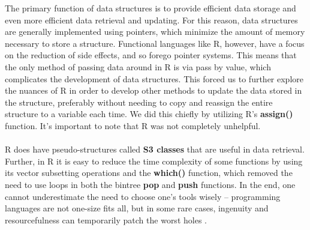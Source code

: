 \documentclass[a4paper, 11pt]{article} %
\begin{document}
\hspace{4ex} The primary function of data structures is to provide efficient data storage and even more efficient data retrieval and updating. For this reason, data structures are generally implemented using pointers, which minimize the amount of memory necessary to store a structure.  Functional languages like R, however,  have a focus on the reduction of side effects, and so forego pointer systems.  This means that the only method of passing data around in R is via pass by value, which complicates the development of data structures. This forced us to further explore the nuances of R in order to develop other methods to update the data stored in the structure, preferably without needing to copy and reassign the entire structure to a variable each time. We did this chiefly by utilizing R's \textbf{assign()} function. It's important to note that R was not completely unhelpful.  
\\\\
\indent R does have pseudo-structures called \textbf{S3 classes} that are useful in data retrieval. Further, in R it is easy to reduce the time complexity of some functions by using its vector subsetting operations and the \textbf{which()} function, which removed the need to use loops in both the bintree \textbf{pop} and \textbf{push} functions. In the end, one cannot underestimate the need to choose one's tools wisely -- programming languages are not one-size fits all, but in some rare cases, ingenuity and resourcefulness can temporarily patch the worst holes . 
\end{document}
